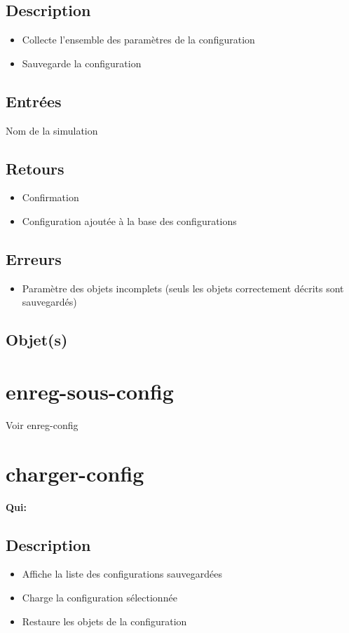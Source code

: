 	\subsection{Description}
	\begin{itemize}
		\item Collecte l'ensemble des paramètres de la configuration
		\item Sauvegarde la configuration
	\end{itemize}

	\subsection{Entrées}
		Nom de la simulation

	\subsection{Retours}
	\begin{itemize}
		\item Confirmation
		\item Configuration ajoutée à la base des configurations
	\end{itemize}

	\subsection{Erreurs}
	\begin{itemize}
		\item Paramètre des objets incomplets (seuls les objets correctement décrits sont sauvegardés)
	\end{itemize}

	\subsection{Objet(s)}
		\allobjs

\section{enreg-sous-config}
	Voir enreg-config

\section{charger-config}
	\textbf{Qui:} \urt

	\subsection{Description}
	\begin{itemize}
		\item Affiche la liste des configurations sauvegardées
		\item Charge la configuration sélectionnée
		\item Restaure les objets de la configuration
	\end{itemize}

